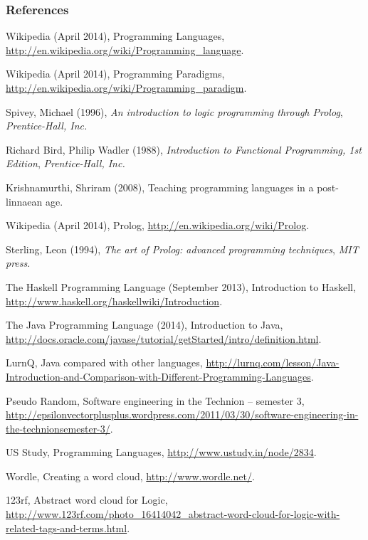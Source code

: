 \documentclass[aspectratio=1610]{beamer}
\begin{document}
\begin{frame} [allowframebreaks]
\frametitle{References}
\footnotesize{
\begin{thebibliography}{9} %

 Wikipedia (April 2014), Programming Languages, \url{http://en.wikipedia.org/wiki/Programming_language}.

 Wikipedia (April 2014), Programming Paradigms, \url{http://en.wikipedia.org/wiki/Programming_paradigm}.

 Spivey, Michael (1996), \textit{An introduction to logic programming through Prolog}, \emph{ Prentice-Hall, Inc.} 

 Richard Bird, Philip Wadler (1988), \textit{ Introduction to Functional Programming, 1st Edition},  \emph{ Prentice-Hall, Inc.}

 Krishnamurthi, Shriram (2008), Teaching programming languages in a post-linnaean age.

 Wikipedia (April 2014), Prolog, \url{http://en.wikipedia.org/wiki/Prolog}.

 Sterling, Leon (1994), \textit{The art of Prolog: advanced programming techniques}, \emph{MIT press}.

 The Haskell Programming Language (September 2013), Introduction to Haskell, \url{http://www.haskell.org/haskellwiki/Introduction}.

 The Java Programming Language (2014), Introduction to Java,
 \url{http://docs.oracle.com/javase/tutorial/getStarted/intro/definition.html}.

 LurnQ, Java compared with other languages, \url{http://lurnq.com/lesson/Java-Introduction-and-Comparison-with-Different-Programming-Languages}.

 Pseudo Random, Software engineering in the Technion – semester 3, \url{http://epsilonvectorplusplus.wordpress.com/2011/03/30/software-engineering-in-the-technionsemester-3/}. 

 US Study, Programming Languages, \url{http://www.ustudy.in/node/2834}. 

 Wordle, Creating a word cloud, \url{http://www.wordle.net/}.

 123rf, Abstract word cloud for Logic, \url{http://www.123rf.com/photo_16414042_abstract-word-cloud-for-logic-with-related-tags-and-terms.html}.


\end{thebibliography}}
\end{frame}
\end{document}
